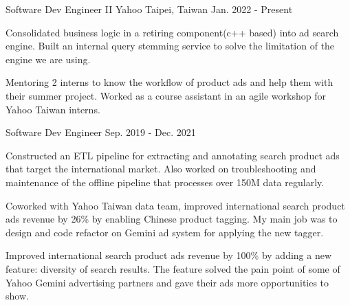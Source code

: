 

\begin{cventries}

  \cventry
    {Software Dev Engineer II} %
    {Yahoo} %
    {Taipei, Taiwan} %
    {Jan. 2022 - Present} %
    {
      \begin{cvitems} %
      \item {Consolidated business logic in a retiring component(c++ based) into ad search engine. Built an internal query stemming service to solve the limitation of the engine we are using.}
        \item {Mentoring 2 interns to know the workflow of product ads and help them with their summer project. Worked as a course assistant in an agile workshop for Yahoo Taiwan interns.}
      \end{cvitems}
    }

  \cventry
    {Software Dev Engineer} %
    {} %
    {} %
    {Sep. 2019 - Dec. 2021} %
    {
      \begin{cvitems} %
        \item {Constructed an ETL pipeline for extracting and annotating search product ads that target the international market. Also worked on troubleshooting and maintenance of the offline pipeline that processes over 150M data regularly.}
        \item {Coworked with Yahoo Taiwan data team, improved international search product ads revenue by 26\% by enabling Chinese product tagging. My main job was to design and code refactor on Gemini ad system for applying the new tagger.}
        \item {Improved international search product ads revenue by 100\% by adding a new feature: diversity of search results. The feature solved the pain point of some of Yahoo Gemini advertising partners and gave their ads more opportunities to show.}
      \end{cvitems}
    }


\end{cventries}
